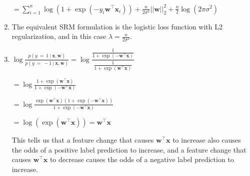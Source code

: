 \documentclass{article}
\begin{document}
\begin{enumerate}[label=(\alph*)]
\begin{center}$= \sum_{i=1}^{n}\log(1 + \exp(-y_i\mathbf{w}^\intercal \mathbf{x}_i))
+ \frac{n}{2\sigma^2}||\mathbf{w}||_2^2
+ \frac{n}{2}\log(2\pi\sigma^2)$ \end{center}\leavevmode

\item The equivalent SRM formulation is the logistic loss function with L2 regularization, and in this case $\lambda =
\frac{n}{2\sigma^2}$.\\

\item \leavevmode
\begin{center}$\log\frac{p(y\:=\:1\:|\:\mathbf{x}, \mathbf{w})}{p(y\:=\:-1\:|\:\mathbf{x}, \mathbf{w})} = \log\dfrac{\frac{1}{1 + \exp(-\mathbf{w}^\intercal \mathbf{x})}}{\frac{1}{1 + \exp(\mathbf{w}^\intercal \mathbf{x})}}$ \end{center}

\begin{center} $= \log\frac{1 + \exp(\mathbf{w}^\intercal \mathbf{x})}{1 + \exp(-\mathbf{w}^\intercal \mathbf{x})}$ \end{center}
\begin{center} $= \log\frac{\exp(\mathbf{w}^\intercal \mathbf{x})(1 + \exp(-\mathbf{w}^\intercal \mathbf{x}))}{1 + \exp(-\mathbf{w}^\intercal \mathbf{x})}$ \end{center}
\begin{center} $= \log(\exp(\mathbf{w}^\intercal \mathbf{x})) = \mathbf{w}^\intercal \mathbf{x}$ \end{center}

This tells us that a feature change that causes $\mathbf{w}^\intercal \mathbf{x}$ to increase also causes the odds of a positive label prediction to increase, and a feature change that causes $\mathbf{w}^\intercal \mathbf{x}$ to decrease causes the odds of a negative label prediction to increase. 

\end{enumerate}
\end{document}
